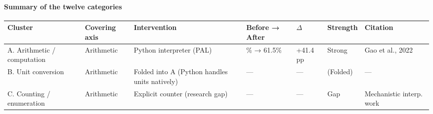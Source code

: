 \documentclass[
]{article}
\newcounter{none} %
\begin{document}
\paragraph{Summary of the twelve
categories}\label{summary-of-the-twelve-categories}

{\def\LTcaptype{none} %
\begin{longtable}[]{@{}
  >{\raggedright\arraybackslash}p{}
  >{\raggedright\arraybackslash}p{}
  >{\raggedright\arraybackslash}p{}
  >{\raggedright\arraybackslash}p{}
  >{\raggedright\arraybackslash}p{}
  >{\raggedright\arraybackslash}p{}
  >{\raggedright\arraybackslash}p{}@{}}
\toprule\noalign{}
\begin{minipage}[b]{\linewidth}\raggedright
Cluster
\end{minipage} & \begin{minipage}[b]{\linewidth}\raggedright
Covering axis
\end{minipage} & \begin{minipage}[b]{\linewidth}\raggedright
Intervention
\end{minipage} & \begin{minipage}[b]{\linewidth}\raggedright
Before → After
\end{minipage} & \begin{minipage}[b]{\linewidth}\raggedright
\(\Delta\)
\end{minipage} & \begin{minipage}[b]{\linewidth}\raggedright
Strength
\end{minipage} & \begin{minipage}[b]{\linewidth}\raggedright
Citation
\end{minipage} \\
\midrule\noalign{}
\endhead
\bottomrule\noalign{}
\endlastfoot
A. Arithmetic / computation & Arithmetic & Python interpreter (PAL) &
20.1\% → 61.5\% & +41.4 pp & Strong & Gao et al., 2022 \\
B. Unit conversion & Arithmetic & Folded into A (Python handles units
natively) & --- & --- & (Folded) & --- \\
C. Counting / enumeration & Arithmetic & Explicit counter (research gap)
& --- & --- & Gap & Mechanistic interp. work \\

\end{longtable}}
\end{document}
